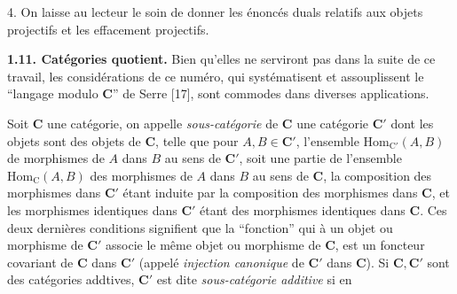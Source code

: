  4. On laisse au lecteur le soin de donner les énoncés duals relatifs
aux objets projectifs et les effacement projectifs.

\textbf{1.11. Catégories quotient.} Bien qu'elles ne serviront pas
dans la suite de ce travail, les considérations de ce numéro, qui
systématisent et assouplissent le ``langage modulo $\mathbf{C}$'' de Serre [17], sont
commodes dans diverses applications.

Soit $\mathbf{C}$ une catégorie, on appelle \textit{sous-catégorie} de $\mathbf{C}$ une catégorie
$\mathbf{C}'$ dont les objets sont des objets de $\mathbf{C}$, telle que pour $A,B\in \mathbf{C}'$,
l'ensemble $\mathrm{Hom}_{\mathrm{C}'}(A,B)$ de morphismes de $A$ dans $B$ au sens de
$\mathbf{C}'$, soit une partie de l'ensemble $\mathrm{Hom}_{\mathrm{C}}(A,B)$ des morphismes de
$A$ dans $B$ au sens de $\mathbf{C}$, la composition des morphismes dans $\mathbf{C}'$ étant
induite par la composition des morphismes dans $\mathbf{C}$, et les morphismes
identiques dans $\mathbf{C}'$ étant des morphismes identiques dans $\mathbf{C}$. Ces deux
dernières conditions signifient que la ``fonction'' qui à un objet ou
morphisme de $\mathbf{C}'$ associe le même objet ou morphisme de $\mathbf{C}$, est un foncteur
covariant de $\mathbf{C}$ dans $\mathbf{C}'$ (appelé \textit{injection canonique} de $\mathbf{C}'$ dans
$\mathbf{C}$). Si $\mathbf{C},\mathbf{C}'$ sont des catégories addtives, $\mathbf{C}'$ est dite
\textit{sous-catégorie additive} si en

